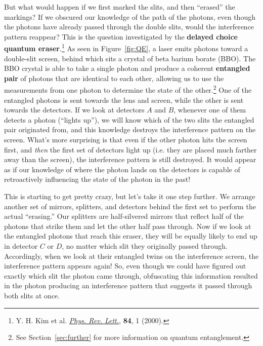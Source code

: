But what would happen if we first marked the slits, and then ``erased'' the markings? If we obscured our knowledge of the path of the photons, even though the photons have already passed through the double slits, would the interference pattern reappear? This is the question investigated by the \textbf{delayed choice quantum eraser}.\footnote{Y. H. Kim et al. \href{https://journals.aps.org/prl/abstract/10.1103/PhysRevLett.84.1}{\emph{Phys. Rev. Lett.}}, \textbf{84}, 1 (2000).} As seen in Figure~\ref{fig:QE}, a laser emits photons toward a double-slit screen, behind which sits a crystal of beta barium borate (BBO). The BBO crystal is able to take a single photon and produce a coherent \textbf{entangled pair} of photons that are identical to each other, allowing us to use the measurements from one photon to determine the state of the other.\footnote{See Section~\ref{sec:further} for more information on quantum entanglement.} One of the entangled photons is sent towards the lens and screen, while the other is sent towards the detectors. If we look at detectors $A$ and $B$, whenever one of them detects a photon (``lights up''), we will know which of the two slits the entangled pair originated from, and this knowledge destroys the interference pattern on the screen. What's more surprising is that even if the other photon hits the screen first, and \emph{then} the first set of detectors light up (i.e. they are placed much farther away than the screen), the interference pattern is still destroyed. It would appear as if our knowledge of where the photon lands on the detectors is capable of retroactively influencing the state of the photon in the past! \par

This is starting to get pretty crazy, but let's take it one step further. We arrange another set of mirrors, splitters, and detectors behind the first set to perform the actual ``erasing.'' Our splitters are half-silvered mirrors that reflect half of the photons that strike them and let the other half pass through. Now if we look at the entangled photons that reach this eraser, they will be equally likely to end up in detector $C$ or $D$, no matter which slit they originally passed through. Accordingly, when we look at their entangled twins on the interference screen, the interference pattern appears again! So, even though we could have figured out exactly which slit the photon came through, obfuscating this information resulted in the photon producing an interference pattern that suggests it passed through both slits at once. \par

